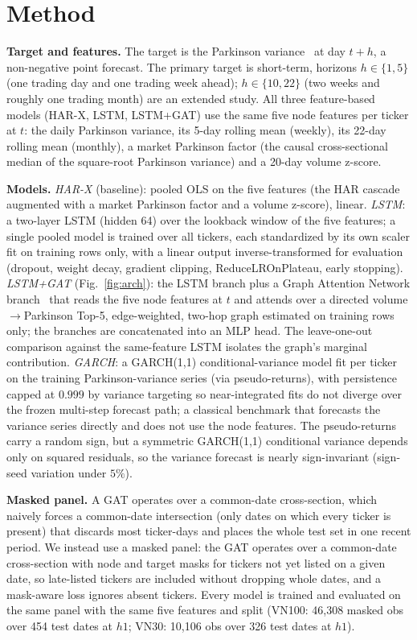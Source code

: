 \documentclass[runningheads]{llncs}
\begin{document}
\section{Method}
\textbf{Target and features.} The target is the Parkinson variance~\cite{parkinson1980} at day $t{+}h$, a
non-negative point forecast. The primary target is short-term, horizons $h\in\{1,5\}$ (one trading day and one
trading week ahead); $h\in\{10,22\}$ (two weeks and roughly one trading month) are an extended study. All
three feature-based models (HAR-X, LSTM, LSTM+GAT) use the same five node features per ticker at $t$: the daily Parkinson variance, its 5-day
rolling mean (weekly), its 22-day rolling mean (monthly), a market Parkinson factor (the causal cross-sectional
median of the square-root Parkinson variance) and a 20-day volume z-score.

\textbf{Models.} \emph{HAR-X} (baseline): pooled OLS on the five features (the HAR cascade augmented with a market Parkinson factor and a volume z-score), linear. \emph{LSTM}: a two-layer LSTM
(hidden 64) over the lookback window of the five features; a single pooled model is trained over all tickers,
each standardized by its own scaler fit on training rows only, with a linear output inverse-transformed for
evaluation (dropout, weight decay, gradient clipping, ReduceLROnPlateau, early stopping). \emph{LSTM+GAT}
(Fig.~\ref{fig:arch}): the LSTM branch plus a Graph Attention Network branch~\cite{gat2018} that reads the five
node features at $t$ and attends over a directed volume$\to$Parkinson Top-5, edge-weighted, two-hop graph
estimated on training rows only; the branches are concatenated into an MLP head. The leave-one-out comparison
against the same-feature LSTM isolates the graph's marginal contribution. \emph{GARCH}: a GARCH(1,1)
conditional-variance model fit per ticker on the training Parkinson-variance series (via pseudo-returns), with
persistence capped at $0.999$ by variance targeting so near-integrated fits do not diverge over the frozen
multi-step forecast path; a classical benchmark that forecasts the variance series directly and does not use
the node features. The pseudo-returns carry a random sign, but a symmetric GARCH(1,1) conditional variance
depends only on squared residuals, so the variance forecast is nearly sign-invariant (sign-seed variation
under $5\%$).

\textbf{Masked panel.} A GAT operates over a common-date cross-section, which naively forces a
common-date intersection (only dates on which every ticker is present) that discards most ticker-days and
places the whole test set in one recent period. We instead use a masked panel: the GAT operates
over a common-date cross-section with node and target masks for tickers not yet listed on a given date, so
late-listed tickers are included without dropping whole dates, and a mask-aware loss ignores absent tickers.
Every model is trained and evaluated on the same panel with the same five features and split (VN100: 46{,}308
masked obs over 454 test dates at $h1$; VN30: 10{,}106 obs over 326 test dates at $h1$).
\end{document}
